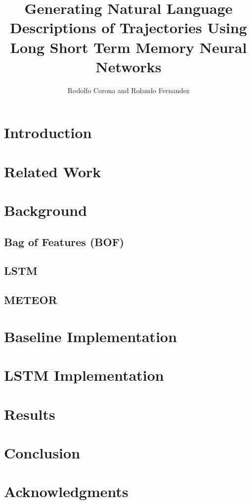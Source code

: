 \documentclass[letterpaper, 12 pt, conference]{ieeeconf}
\title{\LARGE \bf
Generating Natural Language Descriptions of Trajectories Using Long Short Term Memory Neural Networks}
\author{Rodolfo Corona and Rolando Fernandez}
\begin{document}
\maketitle
\thispagestyle{empty}
\pagestyle{empty}

\begin{abstract}

\end{abstract}

\section{Introduction}

\section{Related Work}

\section{Background}

\subsection{Bag of Features (BOF)}

\subsection{LSTM}

\subsection{METEOR}

\section{Baseline Implementation}

\section{LSTM Implementation}

\section{Results}

\section{Conclusion}

\section{Acknowledgments}


%


\end{document}
